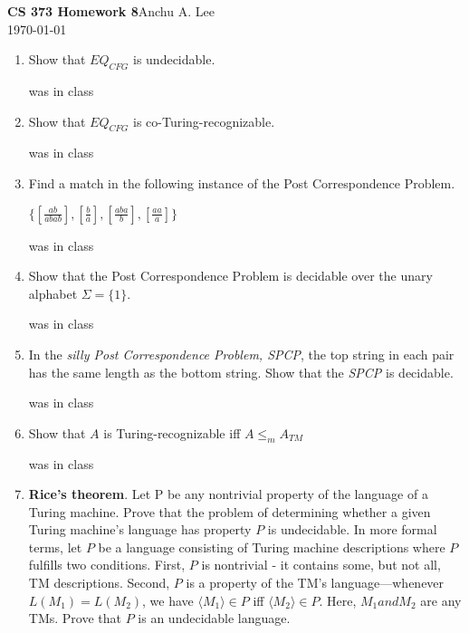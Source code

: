 \documentclass{article}
\begin{document}
    \noindent\textbf{CS 373 Homework 8}\hfill Anchu A. Lee\\
    \noindent\today\\
    \begin{enumerate}
        \item Show that $EQ_{CFG}$ is undecidable.\newline

        was in class
        \item Show that $EQ_{CFG}$ is co-Turing-recognizable.\newline

        was in class
        \item Find a match in the following instance of the Post
        Correspondence Problem.
        \begin{center}
            $\{[\frac{ab}{abab}], [\frac{b}{a}], [\frac{aba}{b}],
            [\frac{aa}{a}]\}$
        \end{center}
        was in class
        \item Show that the Post Correspondence Problem is decidable 
        over the unary alphabet $\Sigma = \{1\}$.\newline

        was in class
        \item  In the \textit{silly Post Correspondence Problem, SPCP}, 
        the top string in each pair has the same length as the bottom 
        string. Show that the \textit{SPCP} is decidable.\newline

        was in class
        \item Show that $A$ is Turing-recognizable iff $A\leq_{m} A_{TM}$\newline

        was in class
        \item \textbf{Rice’s theorem}. Let P be any nontrivial property of the language of a Turing
        machine. Prove that the problem of determining whether a given Turing machine’s
        language has property $P$ is undecidable.\newline
        In more formal terms, let $P$ be a language consisting of Turing machine descriptions 
        where $P$ fulfills two conditions. First, $P$ is nontrivial - it contains some, but
        not all, TM descriptions. Second, $P$ is a property of the TM’s language—whenever
        $L(M_1) = L(M_2)$, we have $\langle M_1 \rangle \in P $ iff $ \langle M_2 \rangle \in P$. 
        Here, $M_1 and M_2$ are any TMs. Prove that $P$ is an undecidable language.\newline


\end{enumerate}
\end{document}
